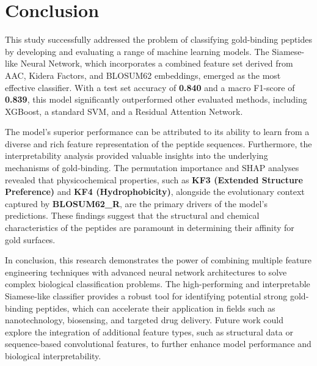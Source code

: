 \documentclass{article}
\begin{document}
\section{Conclusion}
This study successfully addressed the problem of classifying gold-binding peptides by developing and evaluating a range of machine learning models. The Siamese-like Neural Network, which incorporates a combined feature set derived from AAC, Kidera Factors, and BLOSUM62 embeddings, emerged as the most effective classifier. With a test set accuracy of \textbf{0.840} and a macro F1-score of \textbf{0.839}, this model significantly outperformed other evaluated methods, including XGBoost, a standard SVM, and a Residual Attention Network.

The model's superior performance can be attributed to its ability to learn from a diverse and rich feature representation of the peptide sequences. Furthermore, the interpretability analysis provided valuable insights into the underlying mechanisms of gold-binding. The permutation importance \cite{Breiman2001RandomForests} and SHAP analyses \cite{Lundberg2017SHAP} revealed that physicochemical properties, such as \textbf{KF3 (Extended Structure Preference)} and \textbf{KF4 (Hydrophobicity)}, alongside the evolutionary context captured by \textbf{BLOSUM62\_R}, are the primary drivers of the model's predictions. These findings suggest that the structural and chemical characteristics of the peptides are paramount in determining their affinity for gold surfaces.

In conclusion, this research demonstrates the power of combining multiple feature engineering techniques with advanced neural network architectures to solve complex biological classification problems. The high-performing and interpretable Siamese-like classifier provides a robust tool for identifying potential strong gold-binding peptides, which can accelerate their application in fields such as nanotechnology, biosensing, and targeted drug delivery. Future work could explore the integration of additional feature types, such as structural data or sequence-based convolutional features, to further enhance model performance and biological interpretability.



\end{document}
